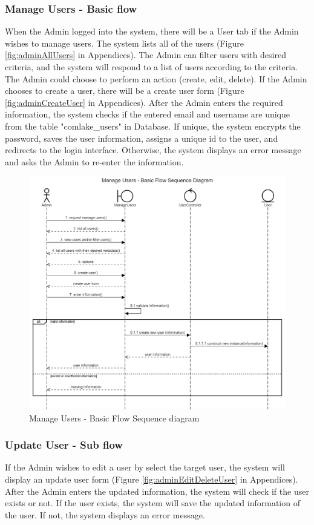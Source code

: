 \subsubsection{Manage Users - Basic flow}
When the Admin logged into the system, there will be a User tab if the Admin wishes to manage users. The system lists all of the users (Figure \ref{fig:adminAllUsers} in Appendices). The Admin can filter users with desired criteria, and the system will respond to a list of users according to the criteria. The Admin could choose to perform an action (create, edit, delete). If the Admin chooses to create a user, there will be a create user form (Figure \ref{fig:adminCreateUser} in Appendices). After the Admin enters the required information, the system checks if the entered email and username are unique from the table "comlake\_users" in Database. If unique, the system encrypts the password, saves the user information, assigns a unique id to the user, and redirects to the login interface. Otherwise, the system displays an error message and asks the Admin to re-enter the information. 
\begin{figure}[H]
    \centering
    \includegraphics[width=1.0\textwidth]{images/Manage Users - Basic Flow Sequence Diagram.png}
    \caption{Manage Users - Basic Flow Sequence diagram}
    \label{fig:SeqUsersBasic}
\end{figure}

\subsubsection{Update User - Sub flow}
If the Admin wishes to edit a user by select the target user, the system will display an update user form (Figure \ref{fig:adminEditDeleteUser} in Appendices). After the Admin enters the updated information, the system will check if the user exists or not. If the user exists, the system will save the updated information of the user. If not, the system displays an error message. 

